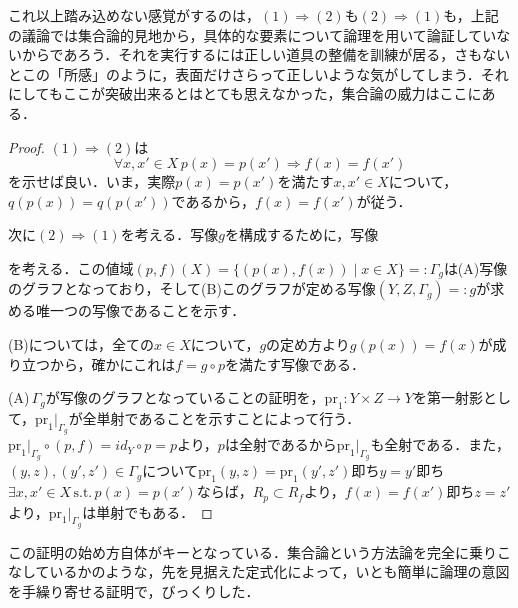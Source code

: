\documentclass[uplatex, 12pt, dvipdfmx]{jsreport}
\begin{document}
これ以上踏み込めない感覚がするのは，$(1)\Rightarrow (2)$も$(2)\Rightarrow (1)$も，上記の議論では集合論的見地から，具体的な要素について論理を用いて論証していないからであろう．それを実行するには正しい道具の整備を訓練が居る，さもないとこの「所感」のように，表面だけさらって正しいような気がしてしまう．それにしてもここが突破出来るとはとても思えなかった，集合論の威力はここにある．
\begin{proof}
    $(1)\Rightarrow (2)$は\[ \forall x,x'\in X \, p(x)=p(x')\Rightarrow f(x)=f(x') \]を示せば良い．いま，実際$p(x)=p(x')$を満たす$x,x'\in X$について，$q(p(x))=q(p(x'))$であるから，$f(x)=f(x')$が従う．

    次に$(2)\Rightarrow (1)$を考える．写像$g$を構成するために，写像
    \begin{center}\end{center}
    を考える．この値域$(p,f)(X)=\{ (p(x),f(x))\mid x\in X \}=:\Gamma_g$は(A)写像のグラフとなっており，そして(B)このグラフが定める写像$(Y,Z,\Gamma_g)=:g$が求める唯一つの写像であることを示す．

    (B)については，全ての$x\in X$について，$g$の定め方より$g(p(x))=f(x)$が成り立つから，確かにこれは$f=g\circ p$を満たす写像である．

    (A)\,$\Gamma_g$が写像のグラフとなっていることの証明を，$\mathrm{pr}_1:Y\times Z\to Y$を第一射影として，$\mathrm{pr}_1|_{\Gamma_g}$が全単射であることを示すことによって行う．
    $\mathrm{pr}_1|_{\Gamma_g}\circ (p,f)=id_Y\circ p=p$より，$p$は全射であるから$\mathrm{pr}_1|_{\Gamma_g}$も全射である．また，$(y,z),(y',z')\in\Gamma_g$について$\mathrm{pr}_1(y,z)=\mathrm{pr}_1(y',z')$即ち$y=y'$即ち
    $\exists x,x'\in X \,\mathrm{s.t.}\, p(x)=p(x')$ならば，$R_p\subset R_f$より，$f(x)=f(x')$即ち$z=z'$より，$\mathrm{pr}_1|_{\Gamma_g}$は単射でもある．
\end{proof}
\begin{remark}
    この証明の始め方自体がキーとなっている．集合論という方法論を完全に乗りこなしているかのような，先を見据えた定式化によって，いとも簡単に論理の意図を手繰り寄せる証明で，びっくりした．
\end{remark}
\end{document}
